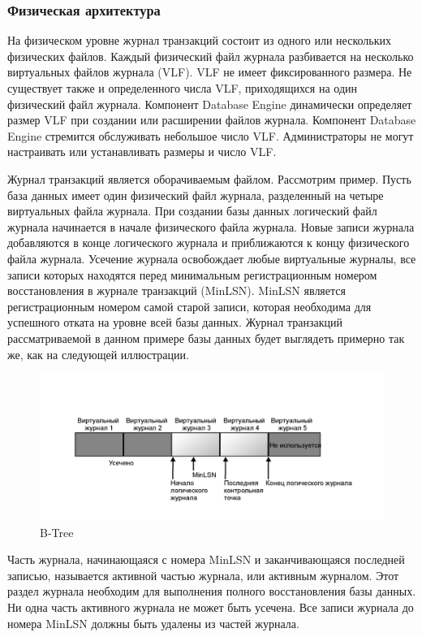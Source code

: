 \subsubsection{Физическая архитектура}

На физическом уровне журнал транзакций состоит из одного или
нескольких физических файлов. Каждый физический файл журнала
разбивается на несколько виртуальных файлов журнала (VLF). VLF не
имеет фиксированного размера. Не существует также и определенного
числа VLF, приходящихся на один физический файл журнала. Компонент
Database Engine динамически определяет размер VLF при создании или
расширении файлов журнала. Компонент Database Engine стремится
обслуживать небольшое число VLF. Администраторы не могут настраивать
или устанавливать размеры и число VLF.

Журнал транзакций является оборачиваемым файлом. Рассмотрим
пример. Пусть база данных имеет один физический файл журнала,
разделенный на четыре виртуальных файла журнала. При создании базы
данных логический файл журнала начинается в начале физического файла
журнала. Новые записи журнала добавляются в конце логического журнала
и приближаются к концу физического файла журнала. Усечение журнала
освобождает любые виртуальные журналы, все записи которых находятся
перед минимальным регистрационным номером восстановления в журнале
транзакций (MinLSN). MinLSN является регистрационным номером самой
старой записи, которая необходима для успешного отката на уровне всей базы данных. Журнал транзакций рассматриваемой в данном примере
базы данных будет выглядеть примерно так же, как на следующей
иллюстрации.

\begin{figure}[ht!]
	\centering
	\includegraphics[width=18cm, keepaspectratio]{assets/physics.png}
	\caption{B-Tree} 
\end{figure}
\FloatBarrier

Часть журнала, начинающаяся с номера MinLSN и заканчивающаяся
последней записью,
называется активной частью журнала, или активным журналом. Этот
раздел журнала
необходим для выполнения полного восстановления базы данных. Ни одна
часть
активного журнала не может быть усечена. Все записи журнала до номера
MinLSN
должны быть удалены из частей журнала.

